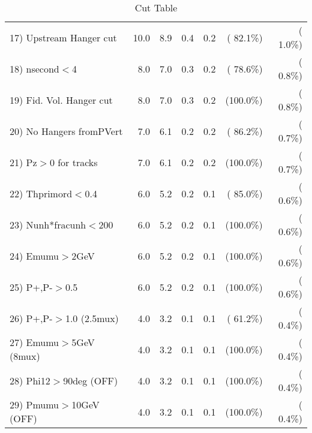 \begin{table}[h!]
\begin{tabular}{||l||r|r|r|r|r|r||}
 17) Upstream Hanger cut  &         10.0 &          8.9 &          0.4 &          0.2 & ( 82.1\%) & (  1.0\%) \\
 18) nsecond$<$4          &          8.0 &          7.0 &          0.3 &          0.2 & ( 78.6\%) & (  0.8\%) \\
 19) Fid. Vol. Hanger cut &          8.0 &          7.0 &          0.3 &          0.2 & (100.0\%) & (  0.8\%) \\
 20) No Hangers fromPVert &          7.0 &          6.1 &          0.2 &          0.2 & ( 86.2\%) & (  0.7\%) \\
 21) Pz$>$0 for tracks    &          7.0 &          6.1 &          0.2 &          0.2 & (100.0\%) & (  0.7\%) \\
 22) Thprimord$<$0.4      &          6.0 &          5.2 &          0.2 &          0.1 & ( 85.0\%) & (  0.6\%) \\
 23) Nunh*fracunh$<$200   &          6.0 &          5.2 &          0.2 &          0.1 & (100.0\%) & (  0.6\%) \\
 24) Emumu$>$2GeV         &          6.0 &          5.2 &          0.2 &          0.1 & (100.0\%) & (  0.6\%) \\
 25) P+,P-$>$0.5          &          6.0 &          5.2 &          0.2 &          0.1 & (100.0\%) & (  0.6\%) \\
 26) P+,P-$>$1.0 (2.5mux) &          4.0 &          3.2 &          0.1 &          0.1 & ( 61.2\%) & (  0.4\%) \\
 27) Emumu$>$5GeV  (8mux) &          4.0 &          3.2 &          0.1 &          0.1 & (100.0\%) & (  0.4\%) \\
 28) Phi12$>$90deg  (OFF) &          4.0 &          3.2 &          0.1 &          0.1 & (100.0\%) & (  0.4\%) \\
 29) Pmumu$>$10GeV  (OFF) &          4.0 &          3.2 &          0.1 &          0.1 & (100.0\%) & (  0.4\%) \\
 \hline
 \hline
 \end{tabular}
 \caption{Cut Table           }
 \label{tab-cutcohjpsi-mumu_cohrho0}
 \end{table}
